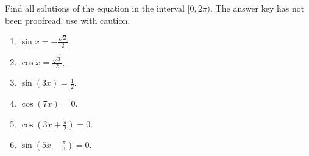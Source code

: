 Find all solutions of the equation in the interval $[0,2\pi)$. The answer key has not been proofread, use with caution.

\begin{enumerate}[ref={\fcProblemRef}]
\item \label{problemsinx=-sqrt(2)/2} $\sin x = -\frac{\sqrt{2}}{2}$.

\item \label{problemcosx=sqrt(3)/2} $\cos x = \frac{\sqrt{3}}{2}$.

\item \label{problemsin(3x)=1/2} $\sin (3x) = \frac{1}{2}$.

\item \label{problemcos(7x)=0} $\cos (7x) = 0$.

\item \label{problemcos(3x+pi/2)=0} $\cos \left(3x+\frac{\pi}{2}\right) = 0$.

\item \label{problemsin(5x-pi/3)=0}$\sin \left(5x-\frac{\pi}{3}\right) = 0$.

\end{enumerate}